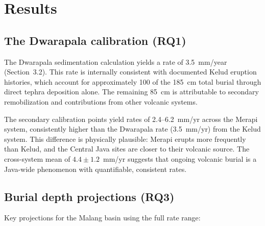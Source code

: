 \documentclass[12pt,a4paper]{article}
\begin{document}
\section{Results}

\subsection{The Dwarapala calibration (RQ1)}

The Dwarapala sedimentation calculation yields a rate of 3.5~mm/year (Section~3.2). This rate is internally consistent with documented Kelud eruption histories, which account for approximately 100 of the 185~cm total burial through direct tephra deposition alone. The remaining 85~cm is attributable to secondary remobilization and contributions from other volcanic systems.

The secondary calibration points yield rates of 2.4--6.2~mm/yr across the Merapi system, consistently higher than the Dwarapala rate (3.5~mm/yr) from the Kelud system. This difference is physically plausible: Merapi erupts more frequently than Kelud, and the Central Java sites are closer to their volcanic source. The cross-system mean of $4.4 \pm 1.2$~mm/yr suggests that ongoing volcanic burial is a Java-wide phenomenon with quantifiable, consistent rates.

\subsection{Burial depth projections (RQ3)}

Key projections for the Malang basin using the full rate range:

\begin{table}[htbp]
\centering
\caption{Projected burial depth by era using empirically-derived sedimentation rates.}
\label{tab:depth}
\end{table}
\end{document}
